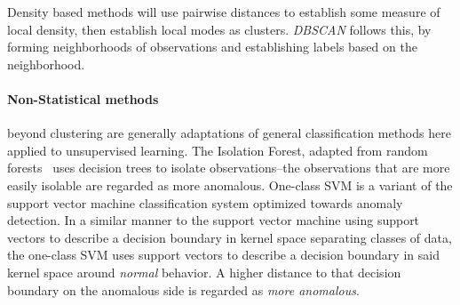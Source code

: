 Density based methods will use pairwise distances to establish some measure of local density, then
    establish local modes as clusters.  \emph{DBSCAN} \citep{ester1996} follows this, by forming
    neighborhoods of observations and establishing labels based on the neighborhood.

\paragraph{Non-Statistical methods} beyond clustering are generally adaptations of general 
    classification methods here applied to unsupervised learning.  The Isolation Forest,\citep{liu2000}
    adapted from random forests~\citep{breiman2001} uses decision trees to isolate observations--the
    observations that are more easily isolable are regarded as more anomalous.  One-class SVM
    \citep{chang2011} is a variant of the support vector machine classification system optimized towards
    anomaly detection. In a similar manner to the support vector machine using support vectors to
    describe a decision boundary in kernel space separating classes of data, the one-class SVM uses 
    support vectors to describe a decision boundary in said kernel space around \emph{normal} behavior.
    A higher distance to that decision boundary on the anomalous side is regarded as \emph{more anomalous}.










